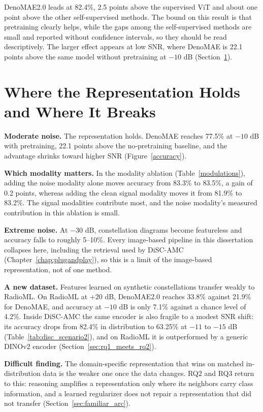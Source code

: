 DenoMAE2.0 leads at 82.4\%, 2.5 points above the supervised ViT and about one point above the other self-supervised methods. The bound on this result is that pretraining clearly helps, while the gaps among the self-supervised methods are small and reported without confidence intervals, so they should be read descriptively. The larger effect appears at low SNR, where DenoMAE is 22.1 points above the same model without pretraining at $-10$ dB (Section~\ref{sec:denomae_limits}).

\section{Where the Representation Holds and Where It Breaks}
\label{sec:denomae_limits}

\textbf{Moderate noise.} The representation holds. DenoMAE reaches 77.5\% at $-10$ dB with pretraining, 22.1 points above the no-pretraining baseline, and the advantage shrinks toward higher SNR (Figure~\ref{accuracy}).

\textbf{Which modality matters.} In the modality ablation (Table~\ref{modulations}), adding the noise modality alone moves accuracy from 83.3\% to 83.5\%, a gain of 0.2 points, whereas adding the clean signal modality moves it from 81.9\% to 83.2\%. The signal modalities contribute most, and the noise modality's measured contribution in this ablation is small.

\textbf{Extreme noise.} At $-30$ dB, constellation diagrams become featureless and accuracy falls to roughly 5--10\%. Every image-based pipeline in this dissertation collapses here, including the retrieval used by DiSC-AMC (Chapter~\ref{chap:plugandplay}), so this is a limit of the image-based representation, not of one method.

\textbf{A new dataset.} Features learned on synthetic constellations transfer weakly to RadioML. On RadioML at $+20$ dB, DenoMAE2.0 reaches 33.8\% against 21.9\% for DenoMAE, and accuracy at $-10$ dB is only 7.1\% against a chance level of 4.2\%. Inside DiSC-AMC the same encoder is also fragile to a modest SNR shift: its accuracy drops from 82.4\% in distribution to 63.25\% at $-11$ to $-15$ dB (Table~\ref{tab:disc_scenario2}), and on RadioML it is outperformed by a generic DINOv2 encoder (Section~\ref{sec:rq1_meets_rq2}).

\textbf{Difficult finding.} The domain-specific representation that wins on matched in-distribution data is the weaker one once the data changes. RQ2 and RQ3 return to this: reasoning amplifies a representation only where its neighbors carry class information, and a learned regularizer does not repair a representation that did not transfer (Section~\ref{sec:familiar_arc}).

